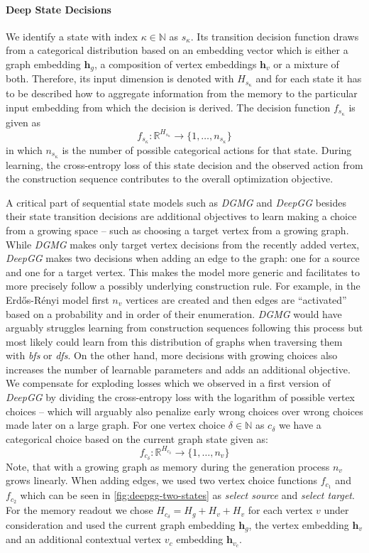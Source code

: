 \documentclass{article}
\begin{document}
\paragraph{Deep State Decisions} We identify a state with index $\kappa\in\mathbb{N}$ as $s_{\kappa}$.
Its transition decision function draws from a categorical distribution based on an embedding vector which is either a graph embedding $\boldsymbol{h}_g$, a composition of vertex embeddings $\boldsymbol{h}_v$ or a mixture of both.
Therefore, its input dimension is denoted with $H_{s_{\kappa}}$ and for each state it has to be described how to aggregate information from the memory to the particular input embedding from which the decision is derived.
The decision function $f_{s_{\kappa}}$ is given as
\[
	f_{s_{\kappa}}: \mathbb{R}^{H_{s_{\kappa}}} \rightarrow \{1,\dots,n_{s_{\kappa}}\}
\]
in which $n_{s_{\kappa}}$ is the number of possible categorical actions for that state.
During learning, the cross-entropy loss of this state decision and the observed action from the construction sequence contributes to the overall optimization objective.

A critical part of sequential state models such as \textit{DGMG} and \textit{DeepGG} besides their state transition decisions are additional objectives to learn making a choice from a growing space -- such as choosing a target vertex from a growing graph.
While \textit{DGMG} makes only target vertex decisions from the recently added vertex, \textit{DeepGG} makes two decisions when adding an edge to the graph:
one for a source and one for a target vertex.
This makes the model more generic and facilitates to more precisely follow a possibly underlying construction rule.
For example, in the Erdős-Rényi model first $n_v$ vertices are created and then edges are ``activated'' based on a probability and in order of their enumeration.
\textit{DGMG} would have arguably struggles learning from construction sequences following this process but most likely could learn from this distribution of graphs when traversing them with \textit{bfs} or \textit{dfs}.
On the other hand, more decisions with growing choices also increases the number of learnable parameters and adds an additional objective.
We compensate for exploding losses which we observed in a first version of \textit{DeepGG} by dividing the cross-entropy loss with the logarithm of possible vertex choices -- which will arguably also penalize early wrong choices over wrong choices made later on a large graph.
For one vertex choice $\delta\in\mathbb{N}$ as $c_{\delta}$ we have a categorical choice based on the current graph state given as:
\[
	f_{c_{\delta}}: \mathbb{R}^{H_{c_{\delta}}} \rightarrow \{1,\dots,n_v\}
\]
Note, that with a growing graph as memory during the generation process $n_v$ grows linearly.
When adding edges, we used two vertex choice functions $f_{c_1}$ and $f_{c_2}$ which can be seen in \autoref{fig:deepgg-two-states} as \textit{select source} and \textit{select target}.
For the memory readout we chose $H_{c_{\delta}} = H_g + H_v + H_v$ for each vertex $v$ under consideration and used the current graph embedding $\boldsymbol{h}_g$, the vertex embedding $\boldsymbol{h}_v$ and an additional contextual vertex $v_c$ embedding $\boldsymbol{h}_{v_c}$.
\end{document}
